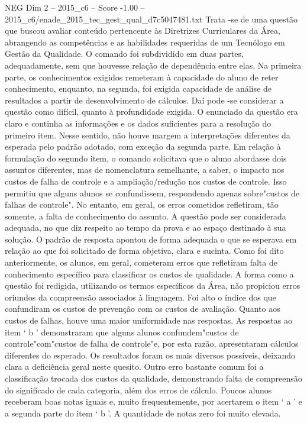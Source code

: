 \begin{textsample}{NEG Dim 2 – 2015\_c6 – Score -1.00 – 2015\_c6/enade\_2015\_tec\_gest\_qual\_d7c5047481.txt}
Trata -se de uma questão que buscou avaliar conteúdo pertencente às Diretrizes Curriculares da Área, abrangendo as competências e as habilidades requeridas de um Tecnólogo em Gestão da Qualidade.
O comando foi subdividido em duas partes, adequadamente, sem que houvesse relação de dependência entre elas.
Na primeira parte, os conhecimentos exigidos remeteram à capacidade do aluno de reter conhecimento, enquanto, na segunda, foi exigida capacidade de análise de resultados a partir de desenvolvimento de cálculos.
Daí pode -se considerar a questão como difícil, quanto à profundidade exigida.
O enunciado da questão era claro e continha as informações e os dados suficientes para a resolução do primeiro item.
Nesse sentido, não houve margem a interpretações diferentes da esperada pelo padrão adotado, com exceção da segunda parte.
Em relação à formulação do segundo item, o comando solicitava que o aluno abordasse dois assuntos diferentes, mas de nomenclatura semelhante, a saber, o impacto nos custos de falha de controle e a ampliação/redução nos custos de controle.
Isso permitiu que alguns alunos se confundissem, respondendo apenas sobre"custos de falhas de controle".
No entanto, em geral, os erros cometidos refletiram, tão somente, a falta de conhecimento do assunto.
A questão pode ser considerada adequada, no que diz respeito ao tempo da prova e ao espaço destinado à sua solução.
O padrão de resposta apontou de forma adequada o que se esperava em relação ao que foi solicitado de forma objetiva, clara e sucinta.
Como foi dito anteriormente, os alunos, em geral, cometeram erros que refletiram falta de conhecimento específico para classificar os custos de qualidade.
A forma como a questão foi redigida, utilizando os termos específicos da Área, não propiciou erros oriundos da compreensão associados à linguagem.
Foi alto o índice dos que confundiram os custos de prevenção com os custos de avaliação.
Quanto aos custos de falhas, houve uma maior uniformidade nas respostas.
As respostas ao item ‘ b ’ demonstraram que alguns alunos confundem"custos de controle"com"custos de falha de controle"e, por esta razão, apresentaram cálculos diferentes do esperado.
Os resultados foram os mais diversos possíveis, deixando clara a deficiência geral neste quesito.
Outro erro bastante comum foi a classificação trocada dos custos da qualidade, demonstrando falta de compreensão do significado de cada categoria, além dos erros de cálculo.
Poucos alunos receberam boas notas iguais e, muito frequentemente, por acertarem o item ‘ a ’ e a segunda parte do item ‘ b ’.
A quantidade de notas zero foi muito elevada.

\end{textsample}
